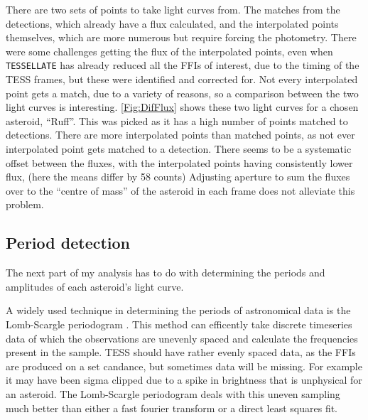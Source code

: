 \documentclass[12pt]{article}
\begin{document}
There are two sets of points to take light curves from.
The matches from the detections, which already have a flux calculated, and the interpolated points themselves, which are more numerous but require forcing the photometry.
There were some challenges getting the flux of the interpolated points, even when \texttt{TESSELLATE} has already reduced all the FFIs of interest, due to the timing of the TESS frames, but these were identified and corrected for.
Not every interpolated point gets a match, due to a variety of reasons, %
so a comparison between the two light curves is interesting.
\autoref{Fig:DifFlux} shows these two light curves for a chosen asteroid, ``Ruff''.
This was picked as it has a high number of points matched to detections.
There are more interpolated points than matched points, as not ever interpolated point gets matched to a detection.
There seems to be a systematic offset between the fluxes, with the interpolated points having consistently lower flux, (here the means differ by 58 counts)
Adjusting aperture to sum the fluxes over to the ``centre of mass'' of the asteroid in each frame does not alleviate this problem.


\subsection*{Period detection}\label{SubSec:Periods}


The next part of my analysis has to do with determining the periods and amplitudes of each asteroid's light curve.

A widely used technique in determining the periods of astronomical data is the Lomb-Scargle periodogram \citep[\citet{Lomb1976,Scargle1982}, but see][for a review]{VanderPlas2018}.
This method can efficently take discrete timeseries data of which the observations are unevenly spaced and calculate the frequencies present in the sample.
TESS should have rather evenly spaced data, as the FFIs are produced on a set candance, but sometimes data will be missing.
For example it may have been sigma clipped due to a spike in brightness that is unphysical for an asteroid.
The Lomb-Scargle periodogram deals with this uneven sampling much better than either a fast fourier transform or a direct least squares fit.
\end{document}
